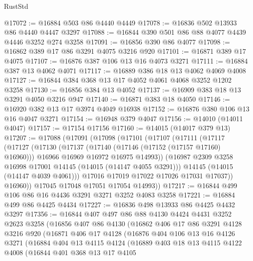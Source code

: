 \begin{lexlean}{RustStd}
\begin{coremodule}
@17072 := @16884 @503 @86 @4440 @4449
@17078 := @16836 @502 @13933 @86 @4440 @4447 @3297
@17088 := @16844 @390 @501 @86 @88 @4077 @4439 @4446 @3252 @274 @3258
@17091 := @16856 @390 @86 @4077
@17098 := @16862 @389 @17 @86 @3291 @4075 @3216 @920
@17101 := @16871 @389 @17 @4075
@17107 := @16876 @387 @106 @13 @16 @4073 @3271
@17111 := @16884 @387 @13 @4062 @4071
@17117 := @16889 @386 @18 @13 @4062 @4069 @4008
@17127 := @16844 @384 @368 @13 @17 @4052 @4061 @4068 @3252 @1202 @3258
@17130 := @16856 @384 @13 @4052
@17137 := @16909 @383 @18 @13 @3291 @4050 @3216 @947
@17140 := @16871 @383 @18 @4050
@17146 := @16920 @382 @13 @17 @3974 @4049 @16938
@17152 := @16876 @380 @106 @13 @16 @4047 @3271
@17154 := @16948 @379 @4047
@17156 := @14010 (@14011 @4047)
@17157 := @17154 @17156
@17160 := @14015 (@14017 @379 @13)
@17207 := @17088
    (@17091
      (@17098
        (@17101
          (@17107
            (@17111
              (@17117
                (@17127
                  (@17130
                    (@17137
                      (@17140 (@17146 (@17152 (@17157 @17160) @16960)))
                      @16966
                      @16969
                      @16972
                      @16975
                      @14993))
                  (@16987 @2309 @3258 @16998 @17001 @14145 (@14015 (@14147 @4055 @3291)))
                  @14145
                  (@14015 (@14147 @4039 @4061)))
                @17016
                @17019
                @17022
                @17026
                @17031
                @17037))
            @16960))
        @17045
        @17048
        @17051
        @17054
        @14993))
@17217 := @16844 @499 @106 @86 @16 @4436 @3291 @3271 @3252 @4083 @3258
@17221 := @16884 @499 @86 @4425 @4434
@17227 := @16836 @498 @13933 @86 @4425 @4432 @3297
@17356 := @16844
    @407
    @497
    @86
    @88
    @4130
    @4424
    @4431
    @3252
    @2623
    @3258
    (@16856
      @407
      @86
      @4130
      (@16862
        @406
        @17
        @86
        @3291
        @4128
        @3216
        @920
        (@16871
          @406
          @17
          @4128
          (@16876
            @404
            @106
            @13
            @16
            @4126
            @3271
            (@16884
              @404
              @13
              @4115
              @4124
              (@16889
                @403
                @18
                @13
                @4115
                @4122
                @4008
                (@16844
                  @401
                  @368
                  @13
                  @17
                  @4105

\end{coremodule}
\end{lexlean}
